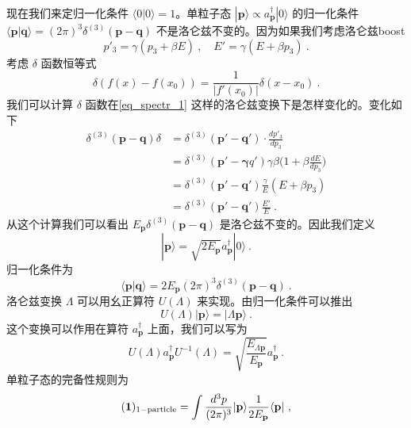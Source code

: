 现在我们来定归一化条件 $\langle 0 | 0 \rangle = 1$。单粒子态 $|\mathbf p\rangle\propto a^\dagger_{\mathbf p} | 0 \rangle$ 的归一化条件 $\langle \mathbf p| \mathbf q\rangle = (2\pi)^3\delta^{(3)}(\mathbf p - \mathbf q)$ 不是洛仑兹不变的。因为如果我们考虑洛仑兹boost
\begin{equation}\label{eq_spectr_1}
p'_3 = \gamma ( p_3+\beta E)~,\quad E' = \gamma(E+\beta p_3)~.
\end{equation}
考虑 $\delta$ 函数恒等式
\begin{equation}
\delta (f(x) - f(x_0)) = \frac{1}{|f'(x_0)|}\delta(x-x_0)~. 
\end{equation}
我们可以计算 $\delta$ 函数在\autoref{eq_spectr_1} 这样的洛仑兹变换下是怎样变化的。变化如下
\begin{equation}
\begin{aligned}
\delta ^{(3)}(\mathbf p -\mathbf q)\delta& = \delta^{(3)}(\mathbf p' - \mathbf q') \cdot \frac{dp'_3}{dp_3}\\
& = \delta^{(3)}(\mathbf p' - \mathbf\gamma q') \gamma\beta\bigg( 1+\beta \frac{dE}{dp_3} \bigg) \\
& = \delta^{(3)}(\mathbf p' - \mathbf q') \frac{\gamma }{E} (E+ \beta p_3) \\
& = \delta^{(3)} (\mathbf p'-\mathbf q') \frac{E'}{E}~.
\end{aligned}
\end{equation}
从这个计算我们可以看出 $E_{\mathbf p}\delta^{(3)}(\mathbf p - \mathbf q)$ 是洛仑兹不变的。因此我们定义
\begin{equation}
|\mathbf p \rangle = \sqrt{2 E_{\mathbf p}} a^\dagger_{\mathbf p} | 0 \rangle~.
\end{equation}
归一化条件为
\begin{equation}
\langle \mathbf p | \mathbf q \rangle = 2 E_{\mathbf p} (2\pi)^3 \delta^{(3)} (\mathbf p - \mathbf q)~. 
\end{equation}
洛仑兹变换 $\Lambda$ 可以用幺正算符 $U(\Lambda)$ 来实现。由归一化条件可以推出
\begin{equation}
U(\Lambda)|\mathbf p\rangle = |\Lambda \mathbf p \rangle ~.
\end{equation}
这个变换可以作用在算符 $a^\dagger_{\mathbf p}$ 上面，我们可以写为
\begin{equation}
U(\Lambda)a^\dagger_{\mathbf p}U^{-1}(\Lambda) = \sqrt{\frac{E_{\Lambda \mathbf p}}{E_{\mathbf p}}} a^\dagger_{\mathbf p}~.
\end{equation}
单粒子态的完备性规则为
\begin{equation}
(\boldsymbol 1)_{\rm 1-particle} = \int \frac{d^3p}{(2\pi)^3} |\mathbf p\rangle \frac{1}{2 E_{\mathbf p}} \langle \mathbf p |~,
\end{equation}
